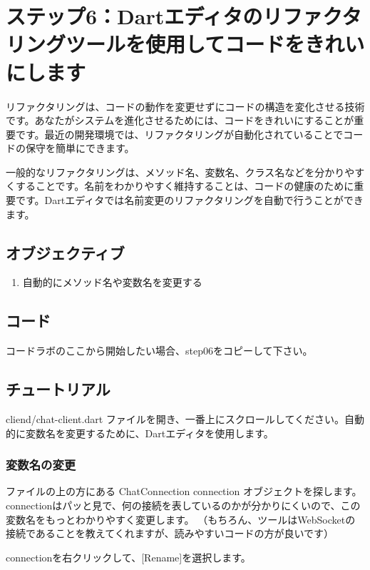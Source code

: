 \section{ステップ6：Dartエディタのリファクタリングツールを使用してコードをきれいにします}

リファクタリングは、コードの動作を変更せずにコードの構造を変化させる技術です。あなたがシステムを進化させるためには、コードをきれいにすることが重要です。最近の開発環境では、リファクタリングが自動化されていることでコードの保守を簡単にできます。

一般的なリファクタリングは、メソッド名、変数名、クラス名などを分かりやすくすることです。名前をわかりやすく維持することは、コードの健康のために重要です。Dartエディタでは名前変更のリファクタリングを自動で行うことができます。

\subsection{オブジェクティブ}

\begin{enumerate}
\item 自動的にメソッド名や変数名を変更する
\end{enumerate}

\subsection{コード}

コードラボのここから開始したい場合、step06をコピーして下さい。

\subsection{チュートリアル}

cliend/chat-client.dart ファイルを開き、一番上にスクロールしてください。自動的に変数名を変更するために、Dartエディタを使用します。

\subsubsection{変数名の変更}

ファイルの上の方にある ChatConnection connection オブジェクトを探します。connectionはパッと見で、何の接続を表しているのかが分かりにくいので、この変数名をもっとわかりやすく変更します。
（もちろん、ツールはWebSocketの接続であることを教えてくれますが、読みやすいコードの方が良いです）

connectionを右クリックして、[Rename]を選択します。

